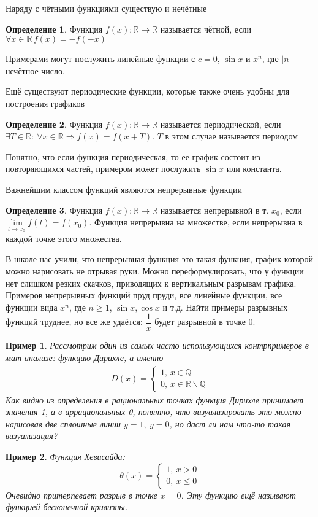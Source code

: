 \documentclass{book} %
\newtheorem{example}{Пример}[chapter] %
\theoremstyle{definition}
\newtheorem{definition}{Определение}[chapter]
\theoremstyle{remark}
\begin{document}
		Наряду с чётными функциями существую и нечётные
		\begin{definition}
			Функция $f(x): \mathbb{R} \to \mathbb{R}$ называется чётной, если $\forall x \in \mathbb{R} \, f(x) = -f(-x)$
		\end{definition}
		Примерами могут послужить линейные функции с $c= 0$, $\sin{x}$ и $x^n$, где $|n|$ - нечётное число.
		
		Ещё существуют периодические функции, которые также очень удобны для построения графиков
		\begin{definition}
				Функция $f(x): \mathbb{R} \to \mathbb{R}$ называется периодической, если $\exists T \in \mathbb{R}: \ \forall x \in \mathbb{R} \Rightarrow f(x) = f(x+T)$. $T$ в этом случае называется периодом
		\end{definition}
		Понятно, что если функция периодическая, то ее график состоит из повторяющихся частей, примером может послужить $\sin{x}$ или константа.
		
		Важнейшим классом функций являются непрерывные функции
		\begin{definition}
				Функция $f(x): \mathbb{R} \to \mathbb{R}$ называется непрерывной в т. $x_0$, если $\lim\limits_{t \to x_0} f(t) = f(x_0)$. Функция непрерывна на множестве, если непрерывна в каждой точке этого множества.
		\end{definition}
		В школе нас учили, что непрерывная функция это такая функция, график которой можно нарисовать не отрывая руки. Можно переформулировать, что у функции нет слишком резких скачков, приводящих к вертикальным разрывам графика. Примеров непрерывных функций пруд пруди, все линейные функции, все функции вида $x^n$, где $n \geq 1$, $\sin{x}, \cos{x}$ и т.д. Найти примеры разрывных функций труднее, но все же удаётся: $\dfrac{1}{x}$ будет разрывной в точке 0.
				\begin{example}
			Рассмотрим один из самых часто использующихся контрпримеров в мат анализе: функцию Дирихле, а именно
			\begin{eqnarray*}
				D(x) = \begin{cases}
					1, \, x \in \mathbb{Q} \\
					0, \, x \in \mathbb{R} \backslash \mathbb{Q}
				\end{cases}
			\end{eqnarray*}
			Как видно из определения в рациональных точках функция Дирихле принимает значения 1, а в иррациональных 0, понятно, что визуализировать это можно нарисовав две сплошные линии $y=1, \ y = 0$, но даст ли нам что-то такая визуализация?
		\end{example}
		\begin{example}
			Функция Хевисайда:
			\begin{equation*}
				\theta(x) = \begin{cases}
					1, \ x > 0 \\
					0, \ x \leq 0
				\end{cases}
			\end{equation*}
			Очевидно притерпевает разрыв в точке $x= 0$. Эту функцию ещё называют функцией бесконечной кривизны.
		\end{example}
		
\end{document}
